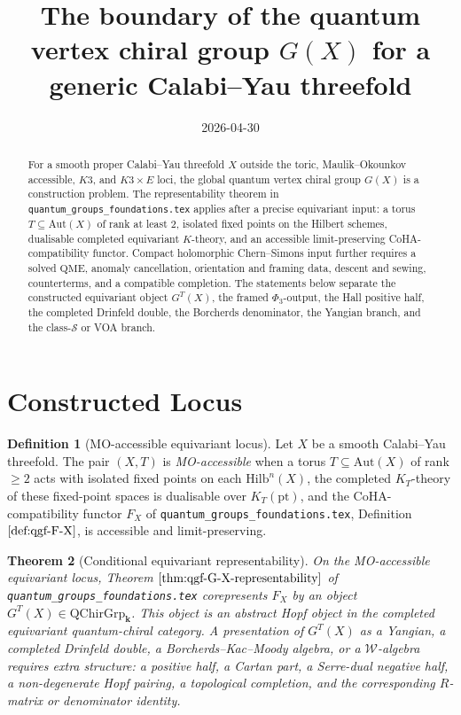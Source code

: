 \documentclass[11pt]{amsart}
\title{The boundary of the quantum vertex chiral group \(G(X)\) for a
generic Calabi--Yau threefold}
\author{}
\date{2026-04-30}
\newtheorem{theorem}{Theorem}
\theoremstyle{definition}
\newtheorem{definition}[theorem]{Definition}
\providecommand{\kk}{\mathbf{k}}
\providecommand{\Aut}{\mathrm{Aut}}
\providecommand{\Hilb}{\mathrm{Hilb}}
\providecommand{\QChirGrp}{\mathrm{QChirGrp}}
\providecommand{\QME}{\mathrm{QME}}
\begin{document}
\maketitle

\begin{abstract}
For a smooth proper Calabi--Yau threefold \(X\) outside the toric,
Maulik--Okounkov accessible, \(K3\), and \(K3\times E\) loci, the
global quantum vertex chiral group \(G(X)\) is a construction problem.
The representability theorem in \texttt{quantum\_groups\_foundations.tex}
applies after a precise equivariant input: a torus
\(T\subseteq \Aut(X)\) of rank at least \(2\), isolated fixed points on
the Hilbert schemes, dualisable completed equivariant \(K\)-theory, and
an accessible limit-preserving CoHA-compatibility functor.  Compact
holomorphic Chern--Simons input further requires a solved \(\QME\),
anomaly cancellation, orientation and framing data, descent and sewing,
counterterms, and a compatible completion.  The statements below
separate the constructed equivariant object \(G^T(X)\), the framed
\(\Phi_3\)-output, the Hall positive half, the completed Drinfeld
double, the Borcherds denominator, the Yangian branch, and the
class-\(\mathcal S\) or VOA branch.
\end{abstract}

\section{Constructed Locus}

\begin{definition}[MO-accessible equivariant locus]
Let \(X\) be a smooth Calabi--Yau threefold.  The pair \((X,T)\) is
\emph{MO-accessible} when a torus \(T\subseteq \Aut(X)\) of rank
\(\geq 2\) acts with isolated fixed points on each \(\Hilb^n(X)\), the
completed \(K_T\)-theory of these fixed-point spaces is dualisable over
\(K_T(\mathrm{pt})\), and the CoHA-compatibility functor \(F_X\) of
\texttt{quantum\_groups\_foundations.tex}, Definition
\(\ref{def:qgf-F-X}\), is accessible and limit-preserving.
\end{definition}

\begin{theorem}[Conditional equivariant representability]
\label{thm:generic-GX-equivariant-representability}
On the MO-accessible equivariant locus, Theorem
\(\ref{thm:qgf-G-X-representability}\) of
\texttt{quantum\_groups\_foundations.tex} corepresents \(F_X\) by an
object \(G^T(X)\in\QChirGrp_\kk\).  This object is an abstract Hopf
object in the completed equivariant quantum-chiral category.  A
presentation of \(G^T(X)\) as a Yangian, a completed Drinfeld double, a
Borcherds--Kac--Moody algebra, or a \(\mathcal W\)-algebra requires
extra structure: a positive half, a Cartan part, a Serre-dual negative
half, a non-degenerate Hopf pairing, a topological completion, and the
corresponding \(R\)-matrix or denominator identity.
\end{theorem}
\end{document}
